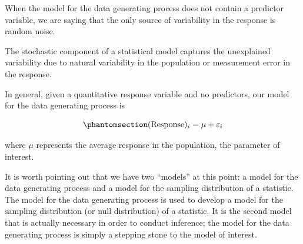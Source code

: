 \documentclass[
  letterpaper,
  DIV=11,
  numbers=noendperiod]{scrreprt}
\theoremstyle{definition}
\theoremstyle{definition}
\theoremstyle{plain}
\theoremstyle{remark}
\begin{document}
When the model for the data generating process does not contain a
predictor variable, we are saying that the only source of variability in
the response is random noise.

\begin{tcolorbox}[enhanced jigsaw, colbacktitle=quarto-callout-tip-color!10!white, colback=white, left=2mm, title=\textcolor{quarto-callout-tip-color}{\faLightbulb}\hspace{0.5em}{Big Idea}, toptitle=1mm, leftrule=.75mm, breakable, bottomrule=.15mm, arc=.35mm, rightrule=.15mm, toprule=.15mm, coltitle=black, opacityback=0, colframe=quarto-callout-tip-color-frame, opacitybacktitle=0.6, bottomtitle=1mm, titlerule=0mm]

The stochastic component of a statistical model captures the unexplained
variability due to natural variability in the population or measurement
error in the response.

\end{tcolorbox}

\begin{tcolorbox}[enhanced jigsaw, colbacktitle=quarto-callout-important-color!10!white, colback=white, left=2mm, title=\textcolor{quarto-callout-important-color}{\faExclamation}\hspace{0.5em}{Data Generating Process for Single Mean Response}, toptitle=1mm, leftrule=.75mm, breakable, bottomrule=.15mm, arc=.35mm, rightrule=.15mm, toprule=.15mm, coltitle=black, opacityback=0, colframe=quarto-callout-important-color-frame, opacitybacktitle=0.6, bottomtitle=1mm, titlerule=0mm]

In general, given a quantitative response variable and no predictors,
our model for the data generating process is

\begin{equation}\phantomsection\label{eq-single-mean}{(\text{Response})_i = \mu + \varepsilon_i}\end{equation}

where \(\mu\) represents the average response in the population, the
parameter of interest.

\end{tcolorbox}

It is worth pointing out that we have two ``models'' at this point: a
model for the data generating process and a model for the sampling
distribution of a statistic. The model for the data generating process
is used to develop a model for the sampling distribution (or null
distribution) of a statistic. It is the second model that is actually
necessary in order to conduct inference; the model for the data
generating process is simply a stepping stone to the model of interest.
\end{document}
